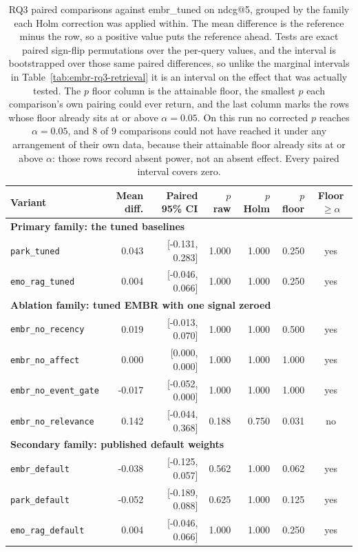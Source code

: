 \begin{table}[tb]
  \centering
  \caption{%
    RQ3 paired comparisons against embr\_tuned on ndcg@5, grouped by the family each Holm correction
    was applied within. The mean difference is the reference minus the row, so a positive value puts
    the reference ahead. Tests are exact paired sign-flip permutations over the per-query values,
    and the interval is bootstrapped over those same paired differences, so unlike the marginal
    intervals in Table~\ref{tab:embr-rq3-retrieval} it is an interval on the effect that was
    actually tested. The $p$ floor column is the attainable floor, the smallest $p$ each
    comparison's own pairing could ever return, and the last column marks the rows whose floor
    already sits at or above $\alpha = 0.05$. On this run no corrected $p$ reaches $\alpha = 0.05$,
    and 8 of 9 comparisons could not have reached it under any arrangement of their own data,
    because their attainable floor already sits at or above $\alpha$: those rows record absent
    power, not an absent effect. Every paired interval covers zero.
  }
  \label{tab:embr-rq3-comparisons}
  \footnotesize
  \setlength{\tabcolsep}{4pt}
  \begin{tabular}{lrrrrrc}
    \toprule
    Variant & Mean diff. & Paired 95\% CI & $p$ raw & $p$ Holm & $p$ floor & Floor $\geq \alpha$ \\
    \midrule
    \multicolumn{7}{l}{\textbf{Primary family: the tuned baselines}} \\
    \texttt{park\_tuned} & 0.043 & [-0.131, 0.283] & 1.000 & 1.000 & 0.250 & yes \\
    \texttt{emo\_rag\_tuned} & 0.004 & [-0.046, 0.066] & 1.000 & 1.000 & 0.250 & yes \\
    \midrule
    \multicolumn{7}{l}{\textbf{Ablation family: tuned EMBR with one signal zeroed}} \\
    \texttt{embr\_no\_recency} & 0.019 & [-0.013, 0.070] & 1.000 & 1.000 & 0.500 & yes \\
    \texttt{embr\_no\_affect} & 0.000 & [0.000, 0.000] & 1.000 & 1.000 & 1.000 & yes \\
    \texttt{embr\_no\_event\_gate} & -0.017 & [-0.052, 0.000] & 1.000 & 1.000 & 1.000 & yes \\
    \texttt{embr\_no\_relevance} & 0.142 & [-0.044, 0.368] & 0.188 & 0.750 & 0.031 & no \\
    \midrule
    \multicolumn{7}{l}{\textbf{Secondary family: published default weights}} \\
    \texttt{embr\_default} & -0.038 & [-0.125, 0.057] & 0.562 & 1.000 & 0.062 & yes \\
    \texttt{park\_default} & -0.052 & [-0.189, 0.088] & 0.625 & 1.000 & 0.125 & yes \\
    \texttt{emo\_rag\_default} & 0.004 & [-0.046, 0.066] & 1.000 & 1.000 & 0.250 & yes \\
    \bottomrule
  \end{tabular}
\end{table}
